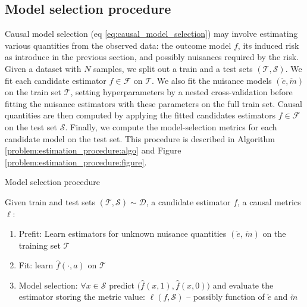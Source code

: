 \documentclass[a4paper,num-refs]{oup-contemporary}%
\begin{document}
\subsection{Model selection procedure}\label{problem:estimation_procedure}

Causal model selection (eq
\ref{eq:causal_model_selection}) may involve estimating various quantities
from the observed data: the outcome model $f$, its induced risk as
introduce in the previous section, and possibly nuisances required by the
risk.
Given a dataset with $N$ samples, we split out a train and a test sets
$(\mathcal{T}, \mathcal{S})$. We
fit each candidate estimator $f \in \mathcal{F}$ on $\mathcal{T}$. We also fit
the nuisance models $(\check e, \check m)$ on the train set
$\mathcal{T}$, setting hyperparameters by a nested
cross-validation before fitting the nuisance estimators with these parameters
on the full train set. Causal quantities are then computed by applying the fitted  candidates
estimators $f \in \mathcal{F}$ on the test set $\mathcal{S}$. Finally, we
compute the model-selection metrics for
each candidate model on the test set. This procedure is described in Algorithm
\ref{problem:estimation_procedure:algo} and Figure
\ref{problem:estimation_procedure:figure}.


\begin{algorithm}[!htbp]
    \caption{Model selection procedure}\label{problem:estimation_procedure:algo} {%
        Given train and test sets $(\mathcal{T}, \mathcal{S}) \sim \mathcal{D}$,
        a candidate estimator $f$, a causal
        metrics $\ell$:
        \begin{enumerate}
            \item Prefit: Learn estimators for unknown nuisance quantities $(\check e,\,\check m)$ on the training set $\mathcal{T}$
            \item Fit: learn $\hat f(\cdot, a)$ on
                  $\mathcal T$
            \item Model selection: $\forall{x} \in \mathcal{S}$ predict
                  $\big(\hat f(x, 1), \hat f(x, 0)\big)$ and evaluate the estimator storing the metric value: $\ell(f, \mathcal S)$ -- possibly
                  function of $\check e$ and $\check m$
        \end{enumerate}

    }
\end{algorithm}
\end{document}

